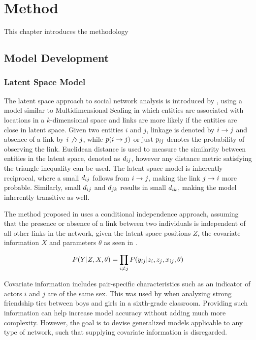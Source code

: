 
\chapter{Method}\label{ch:Method}

This chapter introduces the methodology 

\section{Model Development}

    \subsection{Latent Space Model}
    
        The latent space approach to social network analysis is introduced by \citeauthor{hoff2002latent} \cite{hoff2002latent}, using a model similar to Multidimensional Scaling in which entities are associated with locations in a $k$-dimensional space and links are more likely if the entities are close in latent space.
        Given two entities $i$ and $j$, linkage is denoted by $\link$ and absence of a link by $\link*$, while $p(\link)$ or just $\sub(p)$ denotes the probability of observing the link. 
        Euclidean distance is used to measure the similarity between entities in the latent space, denoted as $\sub(d)$, however any distance metric satisfying the triangle inequality can be used.
        The latent space model is inherently reciprocal, where a small $\sub(d)$ follows from $\link$, making the link $\link(j)(i)$ more probable. Similarly, small $\sub(d)$ and $\sub(d)(jk)$ results in small $\sub(d)(ik)$, making the model inherently transitive as well.
        
        The method proposed in \cite{hoff2002latent} uses a conditional independence approach, assuming that the presence or absence of a link between two individuals is independent of all other links in the network, given the latent space positions $Z$, the covariate information $X$ and parameters $\theta$ as seen in . 
        
        \begin{equation}\label{eq:link-proba}
            P(Y|Z,X,\theta) = \prod_{i\neq j} P(\sub(y)|z_i,z_j,\sub(x),\theta)
        \end{equation}
        
        Covariate information includes pair-specific characteristics such as an indicator of actors $i$ and $j$ are of the same sex. This was used by \citeauthor{hoff2002latent} when analyzing strong friendship ties between boys and girls in a sixth-grade classroom. Providing such information can help increase model accuracy without adding much more complexity. However, the goal is to devise generalized models applicable to any type of network, such that supplying covariate information is disregarded. 
        

